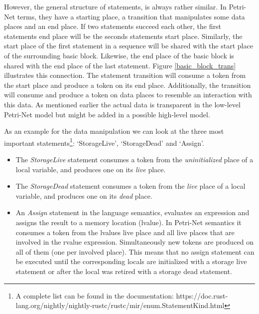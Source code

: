 However, the general structure of statements, is always rather similar.
In Petri-Net terms, they have a starting place, a transition that manipulates some data places and an end place.
If two statements succeed each other, the first statements end place will be the seconds statements start place.
Similarly, the start place of the first statement in a sequence will be shared with the start place of the surrounding basic block.
Likewise, the end place of the basic block is shared with the end place of the last statement.
Figure \ref{basic_block_trans} illustrates this connection.
The statement transition will consume a token from the start place and produce a token on its end place.
Additionally, the transition will consume and produce a token on data places to resemble an interaction with this data.
As mentioned earlier the actual data is transparent in the low-level Petri-Net model but might be added in a possible high-level model.

As an example for the data manipulation we can look at the three most important statements\footnote{A complete list can be found in the documentation:\newline
https://doc.rust-lang.org/nightly/nightly-rustc/rustc/mir/enum.StatementKind.html}: `StorageLive', `StorageDead' and `Assign'.
\begin{itemize}
    \item The \textit{StorageLive} statement consumes a token from the \textit{uninitialized} place of a local variable, and produces one on its \textit{live} place.
    \item The \textit{StorageDead} statement consumes a token from the \textit{live} place of a local variable, and produces one on its \textit{dead} place.
    \item An \textit{Assign} statement in the language semantics, evaluates an expression and assigns the result to a memory location (lvalue).
    In Petri-Net semantics it consumes a token from the lvalues live place and all live places that are involved in the rvalue expression.
    Simultaneously new tokens are produced on all of them (one per involved place).
    This means that no assign statement can be executed until the corresponding locals are initialized with a storage live statement or after the local was retired with a storage dead statement.
\end{itemize}

